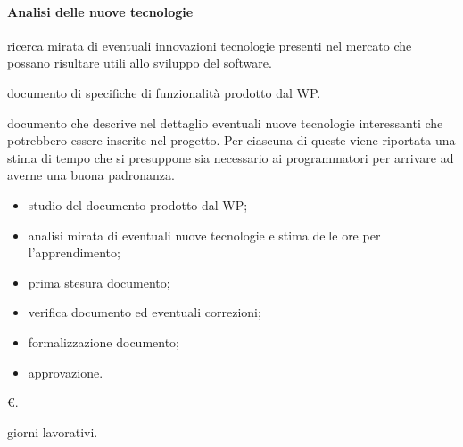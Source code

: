 \paragraph{Analisi delle nuove tecnologie}
\item[Descrizione:] ricerca mirata di eventuali innovazioni tecnologie presenti nel mercato che possano risultare utili allo sviluppo del software.
\item[Responsabile:]
\item[Input:] documento di specifiche di funzionalità prodotto dal WP.
\item[Output:] documento che descrive nel dettaglio eventuali nuove tecnologie interessanti che potrebbero essere inserite nel progetto. Per ciascuna di queste viene riportata una stima di tempo che si presuppone sia necessario ai programmatori per arrivare ad averne una buona padronanza.
\item[Attività:]
\begin{itemize}
\item studio del documento prodotto dal WP;
\item analisi mirata di eventuali nuove tecnologie e stima delle ore per l'apprendimento;
\item prima stesura documento;
\item verifica documento ed eventuali correzioni;
\item formalizzazione documento;
\item approvazione.
\end{itemize}
\item[Costo:] \euro{}.
\item[Tempi di realizzazione:]  giorni lavorativi.

